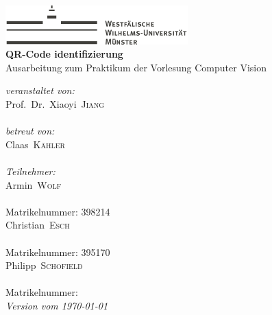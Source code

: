 
\begin{titlepage}
\begin{center}
\includegraphics[height=1.5cm, keepaspectratio]{images/Logo_WWU_Muenster.pdf} \\[1.0cm]
{\huge\sffamily\bfseries QR-Code identifizierung}\\[0.5cm]
{\large Ausarbeitung zum Praktikum der Vorlesung  Computer Vision}\\[3.0cm]
\end{center}

\begin{minipage}[b]{0.5\textwidth}
	{\large \textit{veranstaltet von:}}\\[5pt]
	{\Large Prof.\ Dr.\ Xiaoyi\ \textsc{Jiang}}\\[4pt]
	{}\\[.5cm] 

	{\large \textit{betreut von:}}\\[5pt]
	{\Large Claas\ \textsc{Kähler}}\\[4pt]
	{}\\[0.5cm] 

	{\large \textit{Teilnehmer:}}\\[5pt]
	{\Large Armin\ \textsc{Wolf}}\\[4pt]
    {}\\[4pt]
    {\large Matrikelnummer: 398214}\\[10pt]  
	{\Large Christian\ \textsc{Esch}}\\[4pt]
	{}\\[4pt]
	{\large Matrikelnummer: 395170}\\[10pt]	 
	{\Large Philipp\ \textsc{Schofield}}\\[4pt]
	{}\\[4pt] 
	{\large Matrikelnummer: }\\[0.5cm]
	{\large\itshape Version vom \today}\\
\end{minipage}

\end{titlepage}
